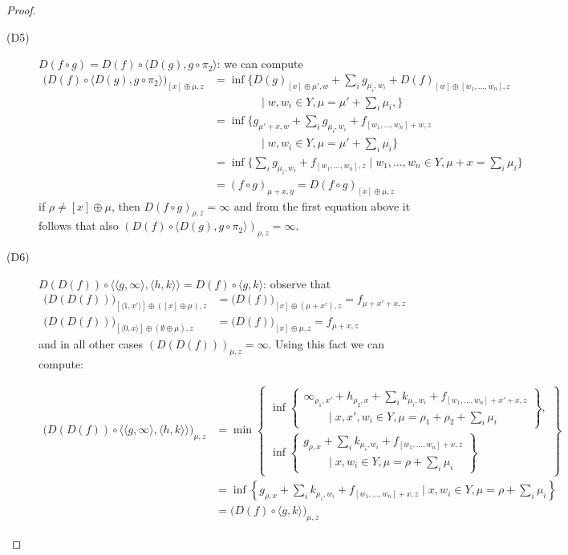 \begin{proof}
\begin{description}
\item[(D5)] $D(f\circ g)=D(f)\circ \langle D(g), g\circ \pi_{2}\rangle$: we can compute
\begin{align*}
\Big( D(f)\circ \langle D(g), g\circ \pi_{2}\rangle\Big)_{[x]\oplus\mu,z}
&=
\inf \Big\{
D(g)_{[x]\oplus\mu',w}+
\sum_{i}g_{\mu_{i},w_{i}}+
D(f)_{[w]\oplus [w_{1},\dots, w_{n}],z}\\
&\qquad\qquad \mid
w,w_{i}\in Y, 
 \mu=\mu'+ \sum_{i}\mu_{i},
\Big\}\\
&=
\inf \Big\{
g_{\mu'+x,w}+
\sum_{i}g_{\mu_{i},w_{i}}+
f_{ [w_{1},\dots, w_{n}]+w,z}\\
&\qquad\qquad \mid
w,w_{i}\in Y, 
 \mu= \mu'+\sum_{i}\mu_{i}
\Big\}
\\
&=\inf\Big\{
\sum_{i} g_{\mu_{i},w_{i}} + f_{[w_{1},\dots, w_{n}],z}
\mid
w_{1},\dots, w_{n}\in Y, 
\mu+x=\sum_{i}\mu_{i}
\Big\}
\\
&= (f\circ g)_{\mu+x,y} =D(f\circ g)_{[x]\oplus\mu,z}
\end{align*}
if $\rho\neq [x]\oplus \mu$, then $D(f\circ g)_{\rho,z}=\infty$ and 
from the first equation above it follows that 
also $( D(f)\circ \langle D(g), g\circ \pi_{2}\rangle)_{\rho,z}=\infty$.



\item[(D6)] $D(D(f))\circ \langle \langle g,\infty\rangle,\langle h,k\rangle\rangle=D(f)\circ  \langle g,k\rangle$:
observe that 
\begin{align*}
\Big(D(D(f))\Big)_{[\langle 1,x'\rangle]\oplus([x]\oplus \mu),z}&=
\big(D(f) \big)_{[x]\oplus (\mu+x'),z }= f_{\mu+x'+x,z}\\
\Big(D(D(f))\Big)_{[\langle 0,x\rangle]\oplus (\emptyset \oplus \mu),z}&=
\big(D(f) \big)_{[x]\oplus \mu,z }= f_{\mu+x,z}
\end{align*}
and in all other cases $(D(D(f)))_{\mu,z}=\infty$.
Using this fact we can compute:


{
\small
\begin{align*}
\Big(D(D(f))\circ \langle \langle g,\infty\rangle,\langle h,k\rangle\rangle\Big)_{\mu,z}&=
\min\left\{
\begin{matrix}
\inf\left\{
\begin{matrix}
\infty_{\rho_{1},x'} + h_{\rho_{2},x}+ \sum_{i}k_{\mu_{i},w_{i}}
+
f_{[w_{1},\dots, w_{n}]+x'+x,z}\\
\qquad \mid 
x,x',w_{i}\in Y, 
\mu=\rho_{1}+\rho_{2}+\sum_{i}\mu_{i}
\end{matrix}
\right\},\\
\inf\left\{
\begin{matrix}
g_{\rho,x}+ \sum_{i}k_{\mu_{i},w_{i}}
+f_{[w_{1},\dots, w_{n}]+x,z}\\
\qquad \mid 
x,w_{i}\in Y, 
\mu=\rho+\sum_{i}\mu_{i}
\end{matrix}
\right\}
\end{matrix}
\right\}\\
&=
\inf\left\{
g_{\rho,x}+ \sum_{i}k_{\mu_{i},w_{i}}
+f_{[w_{1},\dots, w_{n}]+x,z}
\mid 
x,w_{i}\in Y, 
\mu=\rho+\sum_{i}\mu_{i}
\right\}\\
&= \Big(D(f)\circ \langle g,k\rangle\Big)_{\mu,z}
\end{align*}
}


\end{description}
\end{proof}
